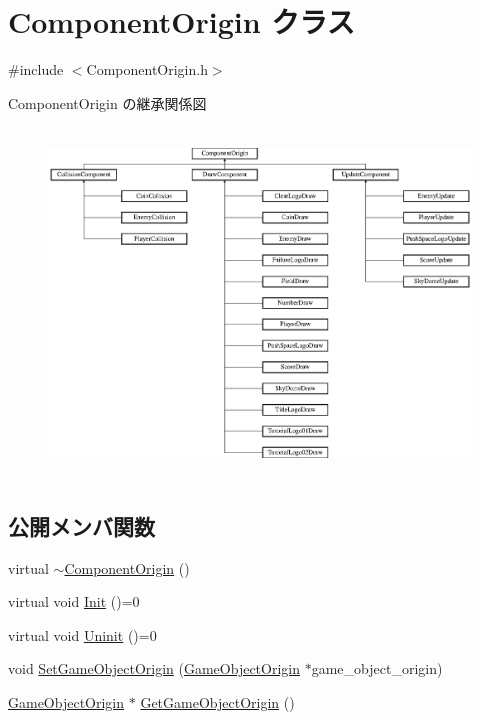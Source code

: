 \hypertarget{class_component_origin}{}\section{Component\+Origin クラス}
\label{class_component_origin}


{\ttfamily \#include $<$Component\+Origin.\+h$>$}

Component\+Origin の継承関係図\begin{figure}[H]
\begin{center}
\leavevmode
\includegraphics[height=9.271523cm]{class_component_origin}
\end{center}
\end{figure}
\subsection*{公開メンバ関数}
\begin{DoxyCompactItemize}
\item 
virtual \mbox{\hyperlink{class_component_origin_af5fc09a42cacd7ba4df66ded1d086970}{$\sim$\+Component\+Origin}} ()
\item 
virtual void \mbox{\hyperlink{class_component_origin_a9f674891257f2272b1636d8b6bb05d81}{Init}} ()=0
\item 
virtual void \mbox{\hyperlink{class_component_origin_a9f89a93f9c1954bd53f9750e35e6089d}{Uninit}} ()=0
\item 
void \mbox{\hyperlink{class_component_origin_aba1eb38e463b1cf2c31589db69b2adef}{Set\+Game\+Object\+Origin}} (\mbox{\hyperlink{class_game_object_origin}{Game\+Object\+Origin}} $\ast$game\+\_\+object\+\_\+origin)
\item 
\mbox{\hyperlink{class_game_object_origin}{Game\+Object\+Origin}} $\ast$ \mbox{\hyperlink{class_component_origin_ab3fe099f93012bc6e09918a6509c4743}{Get\+Game\+Object\+Origin}} ()
\end{DoxyCompactItemize}


